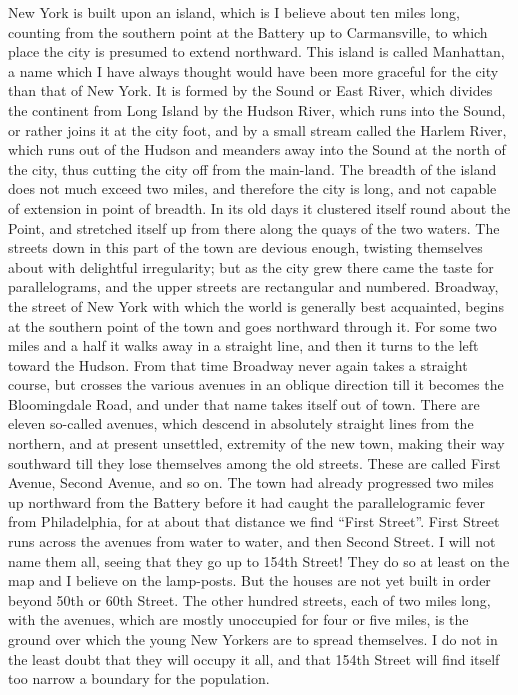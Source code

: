 New York is built upon an island, which is I believe about ten
miles long, counting from the southern point at the Battery up to
Carmansville, to which place the city is presumed to extend
northward.  This island is called Manhattan, a name which I have
always thought would have been more graceful for the city than that
of New York.  It is formed by the Sound or East River, which
divides the continent from Long Island by the Hudson River, which
runs into the Sound, or rather joins it at the city foot, and by a
small stream called the Harlem River, which runs out of the Hudson
and meanders away into the Sound at the north of the city, thus
cutting the city off from the main-land.  The breadth of the island
does not much exceed two miles, and therefore the city is long, and
not capable of extension in point of breadth.  In its old days it
clustered itself round about the Point, and stretched itself up
from there along the quays of the two waters.  The streets down in
this part of the town are devious enough, twisting themselves about
with delightful irregularity; but as the city grew there came the
taste for parallelograms, and the upper streets are rectangular and
numbered.  Broadway, the street of New York with which the world is
generally best acquainted, begins at the southern point of the town
and goes northward through it.  For some two miles and a half it
walks away in a straight line, and then it turns to the left toward
the Hudson.  From that time Broadway never again takes a straight
course, but crosses the various avenues in an oblique direction
till it becomes the Bloomingdale Road, and under that name takes
itself out of town.  There are eleven so-called avenues, which
descend in absolutely straight lines from the northern, and at
present unsettled, extremity of the new town, making their way
southward till they lose themselves among the old streets.  These
are called First Avenue, Second Avenue, and so on.  The town had
already progressed two miles up northward from the Battery before
it had caught the parallelogramic fever from Philadelphia, for at
about that distance we find ``First Street''.  First Street runs
across the avenues from water to water, and then Second Street.  I
will not name them all, seeing that they go up to 154th Street!
They do so at least on the map and I believe on the lamp-posts.
But the houses are not yet built in order beyond 50th or 60th
Street.  The other hundred streets, each of two miles long, with
the avenues, which are mostly unoccupied for four or five miles, is
the ground over which the young New Yorkers are to spread
themselves.  I do not in the least doubt that they will occupy it
all, and that 154th Street will find itself too narrow a boundary
for the population.

